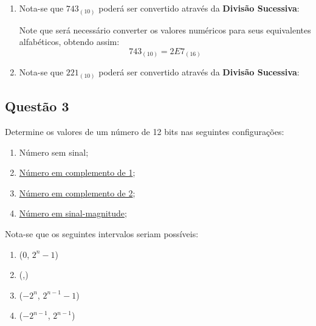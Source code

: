 \documentclass{article}
\begin{document}
\begin{resolution}
\begin{enumerate}[rightmargin = \leftmargin]
                    \item Nota-se que $743_{(10)}$ poderá ser convertido através da \textbf{Divisão Sucessiva}:
                        \begin{figure}[H]
                            \centering
                        \end{figure}
                    Note que será necessário converter os valores numéricos para seus equivalentes alfabéticos, obtendo assim:
                        \begin{equation*}
                            \boxed{743_{(10)} = 2E7_{(16)}}
                        \end{equation*}

                    \item Nota-se que $221_{(10)}$ poderá ser convertido através da \textbf{Divisão Sucessiva}:
                        \begin{figure}[H]
                            \centering
                        \end{figure}
                \end{enumerate}
            \end{resolution}
\newpage

        \subsection{Questão 3}
            \begin{exercise}
                Determine os valores de um número de 12 bits nas seguintes configurações:
                    \begin{enumerate}[noitemsep]
                        \item Número sem sinal;
                        \item \href{https://en.wikipedia.org/wiki/Ones%27_complement}{Número em complemento de 1};
                        \item \href{https://en.wikipedia.org/wiki/Two%27s_complement}{Número em complemento de 2};
                        \item \href{https://en.wikipedia.org/wiki/Signed_number_representations}{Número em sinal-magnitude};
                    \end{enumerate}
            \end{exercise}
            \begin{resolution}
                Nota-se que os seguintes intervalos seriam possíveis:
                    \begin{enumerate}
                        \item (0, $2^{n}-1$)
                        \item (,)
                        \item ($-2^{n}$, $2^{n-1}-1$)
                        \item ($-2^{n-1}$, $2^{n-1}$)
                    \end{enumerate}
            \end{resolution}
\newpage
\end{document}
